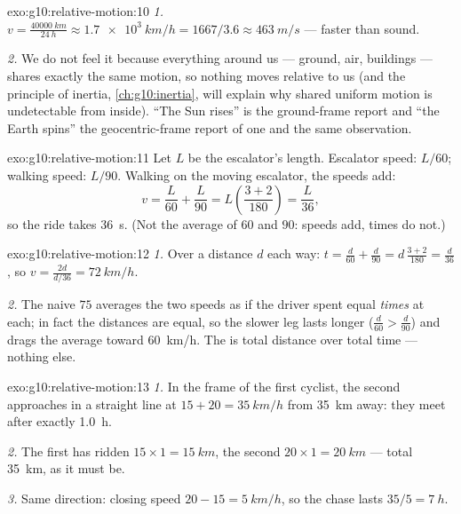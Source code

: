 \begin{solution}{exo:g10:relative-motion:10}
\emph{1.} $v = \frac{\qty{40000}{km}}{\qty{24}{h}}
\approx \qty{1.7e3}{km/h} = 1667/3.6 \approx \qty{463}{m/s}$ ---
faster than sound.

\emph{2.} We do not feel it because everything around us --- ground,
air, buildings --- shares exactly the same motion, so nothing moves
relative to us (and the principle of inertia,
\cref{ch:g10:inertia}, will explain why shared uniform motion is
undetectable from inside). ``The Sun rises'' is the ground-frame
report and ``the Earth spins'' the geocentric-frame report of one and
the same observation.
\end{solution}

\begin{solution}{exo:g10:relative-motion:11}
Let $L$ be the escalator's length. Escalator speed: $L/60$; walking
speed: $L/90$. Walking on the moving escalator, the speeds add:
\[
v = \frac{L}{60} + \frac{L}{90} = L\left(\frac{3 + 2}{180}\right)
= \frac{L}{36},
\]
so the ride takes \qty{36}{s}. (Not the average of $60$ and $90$:
speeds add, times do not.)
\end{solution}

\begin{solution}{exo:g10:relative-motion:12}
\emph{1.} Over a distance $d$ each way:
$t = \frac{d}{60} + \frac{d}{90} = d\,\frac{3 + 2}{180} = \frac{d}{36}$,
so $v = \frac{2d}{d/36} = \qty{72}{km/h}$.

\emph{2.} The naive $75$ averages the two speeds as if the driver spent
equal \emph{times} at each; in fact the distances are equal, so the
slower leg lasts longer ($\frac{d}{60} > \frac{d}{90}$) and drags the
average toward \qty{60}{km/h}. The  is total distance over
total time --- nothing else.
\end{solution}

\begin{solution}{exo:g10:relative-motion:13}
\emph{1.} In the frame of the first cyclist, the second approaches in a
straight line at $15 + 20 = \qty{35}{km/h}$ from \qty{35}{km} away:
they meet after exactly \qty{1.0}{h}.

\emph{2.} The first has ridden $15 \times 1 = \qty{15}{km}$, the second
$20 \times 1 = \qty{20}{km}$ --- total \qty{35}{km}, as it must be.

\emph{3.} Same direction: closing speed $20 - 15 = \qty{5}{km/h}$, so
the chase lasts $35/5 = \qty{7}{h}$.
\end{solution}

